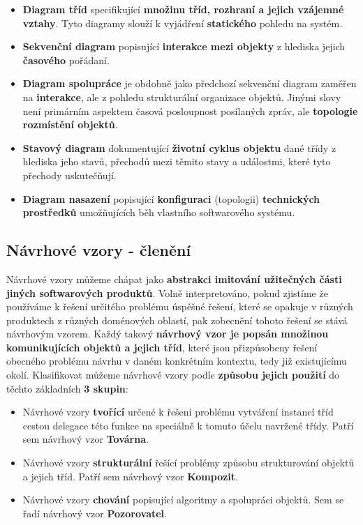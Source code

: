 \begin{itemize}
\item \textbf{Diagram tříd} specifikující \textbf{množinu tříd, rozhraní a jejich vzájemné vztahy}. Tyto diagramy slouží k vyjádření \textbf{statického} pohledu na systém.
\item \textbf{Sekvenční diagram} popisující \textbf{interakce mezi objekty} z hlediska jejich \textbf{časového} pořádaní.
\item \textbf{Diagram spolupráce} je obdobně jako předchozí sekvenční diagram zaměřen na \textbf{interakce}, ale {z pohledu strukturální organizace objektů}. Jinými slovy není primárním aspektem časová posloupnost posílaných zpráv, ale\textbf{ topologie rozmístění objektů}.
\item \textbf{Stavový diagram} dokumentující \textbf{životní cyklus objektu} dané třídy z hlediska jeho stavů, přechodů mezi těmito stavy a událostmi, které tyto přechody uskutečňují.
\item \textbf{Diagram nasazení} popisující \textbf{konfiguraci} (topologii) \textbf{technických prostředků} umožňujících běh vlastního softwarového systému.
\end{itemize}

\subsection{Návrhové vzory - členění}
Návrhové vzory můžeme chápat jako \textbf{abstrakci imitování užitečných části jiných softwarových produktů}. Volně interpretováno, pokud zjistíme že používáme k řešení určitého problému úspěšné řešení, které se opakuje v různých produktech z různých doménových oblastí, pak zobecnění tohoto řešení se stává návrhovým vzorem. Každý takový \textbf{návrhový vzor je popsán množinou komunikujících objektů a jejich tříd}, které jsou přizpůsobeny řešení obecného problému návrhu v daném konkrétním kontextu, tedy již existujícímu okolí. Klasifikovat můžeme návrhové vzory podle \textbf{způsobu jejich použití} do těchto základních \textbf{3 skupin}:
\begin{itemize}
\item Návrhové vzory \textbf{tvořící} určené k řešení problému vytváření instancí tříd cestou delegace této funkce na speciálně k tomuto účelu navržené třídy. Patří sem návrhový vzor \textbf{Továrna}.
\item Návrhové vzory \textbf{strukturální} řešící problémy způsobu strukturování objektů a jejich tříd. Patří sem návrhový vzor \textbf{Kompozit}.
\item Návrhové vzory \textbf{chování} popisující algoritmy a spolupráci objektů. Sem se řadí návrhový vzor \textbf{Pozorovatel}.
\end{itemize}



